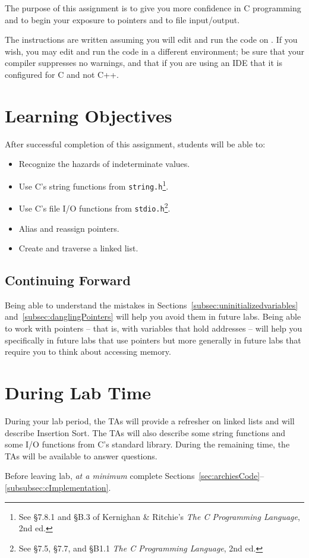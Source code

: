The purpose of this assignment is to give you more confidence in C programming and to begin your exposure to pointers and to file input/output.

The instructions are written assuming you will edit and run the code on \runtimeenvironment.
If you wish, you may edit and run the code in a different environment;
be sure that your compiler suppresses no warnings, and that if you are using an IDE that it is configured for C and not C++.

\section*{Learning Objectives}

After successful completion of this assignment, students will be able to:
\begin{itemize}
    \item Recognize the hazards of indeterminate values.
    \item Use C's string functions from \lstinline{string.h}\footnote{\label{note:stringFunctions}See \S7.8.1 and \S{}B.3 of Kernighan \& Ritchie's \textit{The C Programming Language}, 2nd ed.}.
    \item Use C's file I/O functions from \lstinline{stdio.h}\footnote{See \S7.5, \S7.7, and \S{}B1.1 \textit{The C Programming Language}, 2nd ed.}.
    \item Alias and reassign pointers.
    \item Create and traverse a linked list.
\end{itemize}

\subsection*{Continuing Forward}

Being able to understand the mistakes in Sections~\ref{subsec:uninitializedvariables} and~\ref{subsec:danglingPointers} will help you avoid them in future labs.
Being able to work with pointers -- that is, with variables that hold addresses -- will help you specifically in future labs that use pointers but more generally in future labs that require you to think about accessing memory.

\section*{During Lab Time}

During your lab period, the TAs will provide a refresher on linked lists and will describe Insertion Sort.
The TAs will also describe some string functions and some I/O functions from C's standard library.
During the remaining time, the TAs will be available to answer questions.

Before leaving lab, \textit{at a minimum} complete Sections~\ref{sec:archiesCode}--\ref{subsubsec:cImplementation}.
